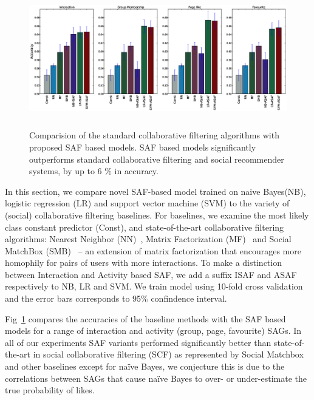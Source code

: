 \begin{figure}[tbp!]
\hspace{-6mm}\includegraphics[width=180mm,height=60mm]{data/plots/accuracy/accuracyLargeNew.eps}
\caption{  Comparision of the standard collaborative filtering algorithms with proposed SAF based models.  SAF based models significantly outperforms standard collaborative filtering and social recommender systems, by up to 6 \% in accuracy. }
\label{Fig1}
\end{figure}

In this section, we compare novel SAF-based model trained on naive Bayes(NB), 
logistic regression (LR) and support vector machine (SVM) to the variety of
(social) collaborative filtering baselines. For baselines, we examine the most 
likely class constant predictor (Const), and state-of-the-art collaborative 
filtering algorithms: Nearest Neighbor (NN)~\cite{bellkor}, Matrix Factorization (MF)~\cite{pmf} 
and Social MatchBox (SMB)~\cite{Noel2012NOF} -- an extension of matrix
factorization that encourages more homophily for pairs of users with
more interactions. To make a distinction between Interaction and Activity based SAF, 
we add a suffix ISAF and ASAF respectively to NB, LR and SVM. We train model using
10-fold cross validation and the error bars corresponds to 95\% confindence interval.

Fig~\ref{Fig1} compares the accuracies of the baseline methods 
with the SAF based models for a range of interaction and activity (group,
page, favourite) SAGs.  In all of our experiments SAF variants
performed significantly better than state-of-the-art in social
collaborative filtering (SCF) as represented by Social
Matchbox~\cite{Noel2012NOF} and other baselines except for na\"{i}ve Bayes, 
we conjecture this is due to the correlations between SAGs that cause na\"{i}ve
Bayes to over- or under-estimate the true probability of likes.

